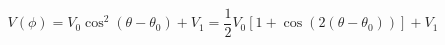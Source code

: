 \begin{equation}
\label{eq:Photodiode_Voltage}
V(\phi) = V_{0} \cos^2(\theta - {\theta}_0)+ V_{1} = \frac{1}{2}V_0\left[1 + \cos(2 (\theta - \theta_0))\right]+ V_1
\end{equation}